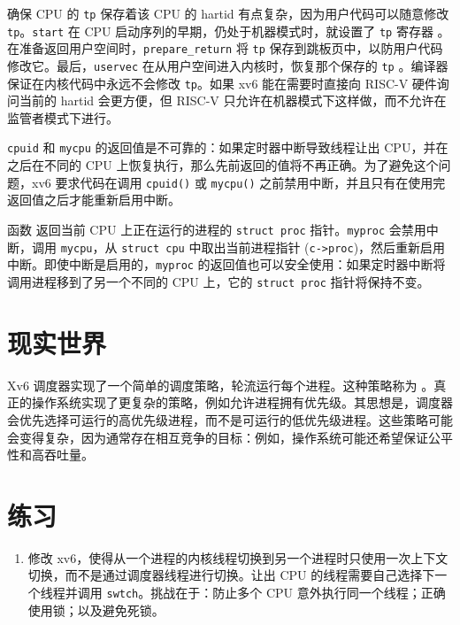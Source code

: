确保 CPU 的 \lstinline{tp} 保存着该 CPU 的 hartid 有点复杂，因为用户代码可以随意修改 \lstinline{tp}。\lstinline{start} 在 CPU 启动序列的早期，仍处于机器模式时，就设置了 \lstinline{tp} 寄存器 。在准备返回用户空间时，\lstinline{prepare_return} 将 \lstinline{tp} 保存到跳板页中，以防用户代码修改它。最后，\lstinline{uservec} 在从用户空间进入内核时，恢复那个保存的 \lstinline{tp} 。编译器保证在内核代码中永远不会修改 \lstinline{tp}。如果 xv6 能在需要时直接向 RISC-V 硬件询问当前的 hartid 会更方便，但 RISC-V 只允许在机器模式下这样做，而不允许在监管者模式下进行。

\lstinline{cpuid} 和 \lstinline{mycpu} 的返回值是不可靠的：如果定时器中断导致线程让出 CPU，并在之后在不同的 CPU 上恢复执行，那么先前返回的值将不再正确。为了避免这个问题，xv6 要求代码在调用 {\tt cpuid()} 或 {\tt mycpu()} 之前禁用中断，并且只有在使用完返回值之后才能重新启用中断。

函数   返回当前 CPU 上正在运行的进程的 \lstinline{struct proc} 指针。\lstinline{myproc} 会禁用中断，调用 \lstinline{mycpu}，从 \lstinline{struct cpu} 中取出当前进程指针 (\lstinline{c->proc})，然后重新启用中断。即使中断是启用的，\lstinline{myproc} 的返回值也可以安全使用：如果定时器中断将调用进程移到了另一个不同的 CPU 上，它的 \lstinline{struct proc} 指针将保持不变。

\section{现实世界}

Xv6 调度器实现了一个简单的调度策略，轮流运行每个进程。这种策略称为 。真正的操作系统实现了更复杂的策略，例如允许进程拥有优先级。其思想是，调度器会优先选择可运行的高优先级进程，而不是可运行的低优先级进程。这些策略可能会变得复杂，因为通常存在相互竞争的目标：例如，操作系统可能还希望保证公平性和高吞吐量。

\section{练习}

\begin{enumerate}

\item 修改 xv6，使得从一个进程的内核线程切换到另一个进程时只使用一次上下文切换，而不是通过调度器线程进行切换。让出 CPU 的线程需要自己选择下一个线程并调用 \texttt{swtch}。挑战在于：防止多个 CPU 意外执行同一个线程；正确使用锁；以及避免死锁。

\end{enumerate}
